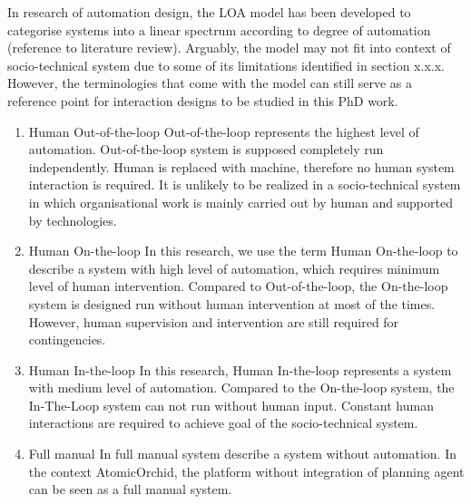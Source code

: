 In research of automation design, the LOA model has been developed to categorise systems into a linear spectrum according to degree of automation (reference to literature review). Arguably, the model may not fit into context of socio-technical system due to some of its limitations identified in section x.x.x. However, the terminologies that come with the model can still serve as a reference point for interaction designs to be studied in this PhD work.


\begin{enumerate}
\item Human Out-of-the-loop
Out-of-the-loop represents the highest level of automation. Out-of-the-loop system is supposed completely run independently. Human is replaced with machine, therefore no human system interaction is required. It is unlikely to be realized in a socio-technical system in which organisational work is mainly carried out by human and supported by technologies.  \\

\item Human On-the-loop 
In this research, we use the term Human On-the-loop to describe a system with high level of automation, which requires minimum level of human intervention. Compared to Out-of-the-loop, the On-the-loop system is designed run without human intervention at most of the times. However, human supervision and intervention are still required for contingencies. 

\item Human In-the-loop 
In this research, Human In-the-loop represents  a system with medium level of automation. Compared to the On-the-loop system, the In-The-Loop system can not run without human input. Constant human interactions are required to achieve goal of the socio-technical system. \\

\item Full manual 
In full manual system describe a system without automation. In the context AtomicOrchid, the platform without integration of planning agent  can be seen as a full manual system. 

\end{enumerate}

